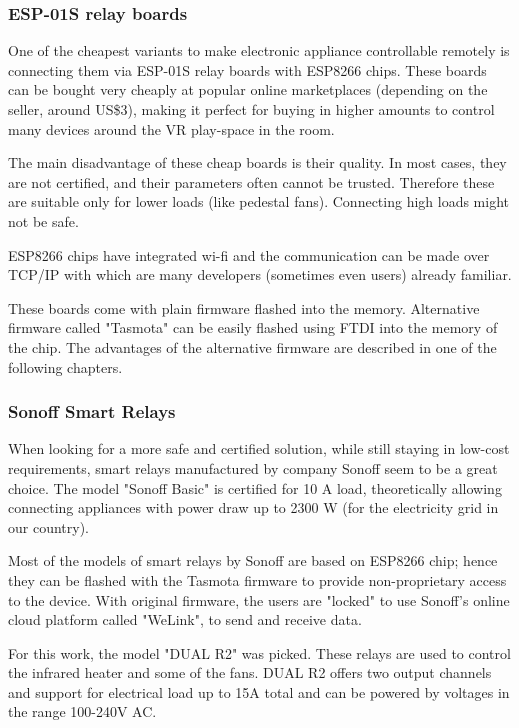 \hypertarget{x-esp-01s-relay-boards}{\subsubsection*{ESP-01S relay boards}}
One of the cheapest variants to make electronic appliance controllable
remotely is connecting them via ESP-01S relay boards with ESP8266 chips.
These boards can be bought very cheaply at popular online marketplaces
(depending on the seller, around US\$3), making it perfect for buying in
higher amounts to control many devices around the VR play-space in the room.


The main disadvantage of these cheap boards is their quality. In most cases,
they are not certified, and their parameters often cannot be trusted. Therefore
these are suitable only for lower loads (like pedestal fans). Connecting high
loads might not be safe.


ESP8266 chips have integrated wi-fi and the communication can be made over
TCP/IP with which are many developers (sometimes even users) already familiar.


These boards come with plain firmware flashed into the memory. Alternative
firmware called "Tasmota" can be easily flashed using FTDI into the memory
of the chip. The advantages of the alternative firmware are described
in one of the following chapters.


\hypertarget{x-sonoff-smart-relays}{\subsubsection*{Sonoff Smart Relays}}
When looking for a more safe and certified solution, while still staying in
low-cost requirements, smart relays manufactured by company Sonoff
seem to be a great choice. The model "Sonoff Basic" is certified for 10 A load,
theoretically allowing connecting appliances with power draw up to 2300 W (for the
electricity grid in our country).


Most of the models of smart relays by Sonoff are based on ESP8266 chip;
hence they can be flashed with the Tasmota firmware to provide non-proprietary
access to the device. With original firmware, the users are "locked" to use
Sonoff’s online cloud platform called "WeLink", to send and receive data.


For this work, the model "DUAL R2" was picked. These relays are used to
control the infrared heater and some of the fans. DUAL R2 offers two output
channels and support for electrical load up to 15A total and can be powered
by voltages in the range 100-240V AC.



